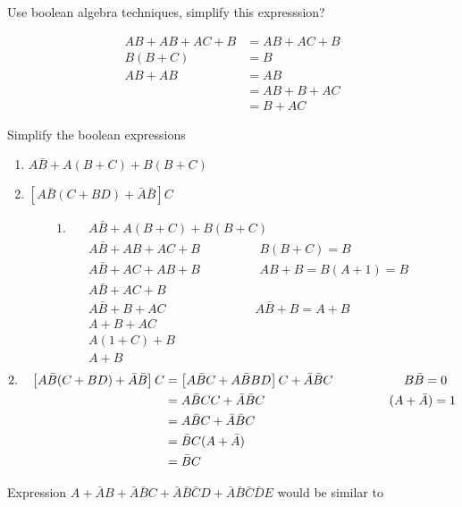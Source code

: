 \begin{exercise}
	Use boolean algebra techniques, simplify this expresssion?
\end{exercise}
\begin{answer}
	\begin{align*}
	AB+AB+AC+B&=AB+AC+B\\
	B(B+C)&=B\\
	AB+AB&=AB\\
	&=AB+B+AC\\
	&=B+AC
	\end{align*}
\end{answer}
\begin{exercise}
	Simplify the boolean expressions\\
	\begin{enumerate}
		\item $A\bar{B}+A(B+C)+B(B+C)$
		\item $\left[ A\bar{B}(C+BD)+\bar{A}\bar{B}\right]C $
	\end{enumerate}
\end{exercise}
\begin{answer}
	\begin{align*}
	\text{1.}\quad &A\bar{B}+A(B+C)+B(B+C)\\
	&A\bar{B}+AB+AC+B\hspace{2cm}B(B+C)=B\\
	&A\bar{B}+AC+AB+B\hspace{2cm}AB+B=B(A+1)=B\\
	&A\bar{B}+AC+B\\
	&A\bar{B}+B+AC\hspace{3cm}A\bar{B}+B=A+B\\
	&A+B+AC\\
	&A(1+C)+B\\
	&A+B
	\end{align*}
	\begin{align*}
	\text{2.}\quad \left[A\bar{B}(C+BD)+\bar{A}\bar{B} \right]C 
	&=\left[A\bar{B}C+A\bar{B}BD \right] C+\bar{A}\bar{B}C\hspace{2cm}B\bar{B}=0\\
	&=A\bar{B}CC+\bar{A}\bar{B}C\hspace{3.5cm}(A+\bar{A})=1\\
	&=A\bar{B}C+\bar{A}\bar{B}C\\
	&=\bar{B}C(A+\bar{A})\\
	&=\bar{B}C
	\end{align*}
\end{answer}
\begin{exercise}
	Expression $A+\bar{A}B+\bar{A}\bar{B}C+\bar{A}\bar{B}\bar{C}D+\bar{A}\bar{B}\bar{C}\bar{D}E$ would be similar to 
\end{exercise}

